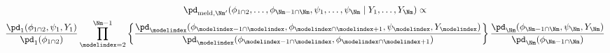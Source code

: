 \begin{multline}
  \pd_{\text{meld}, \Nm'}(\phi_{1 \cap 2}, \ldots, \phi_{\Nm - 1 \cap \Nm}, \psi_{1}, \ldots, \psi_{\Nm} \mid Y_{1}, \ldots, Y_{\Nm}) \propto \\ 
  \frac {
      \pd_{1} (\phi_{1 \cap 2}, \psi_{1}, Y_{1})
    } {
      \pd_{1}(\phi_{1 \cap 2})
    }
  \prod_{\modelindex = 2}^{\Nm - 1} \left\{
    \frac {
      \pd_{\modelindex} (\phi_{\modelindex - 1 \cap \modelindex}, \phi_{\modelindex \cap \modelindex + 1}, \psi_{\modelindex}, Y_{\modelindex})
    } {
      \pd_{\modelindex}(\phi_{\modelindex - 1 \cap \modelindex}, \phi_{\modelindex \cap \modelindex + 1})
    }
  \right\}
  \frac {
    \pd_{\Nm} (\phi_{\Nm - 1 \cap \Nm}, \psi_{\Nm}, Y_{\Nm})
  } {
    \pd_{\Nm}(\phi_{\Nm - 1 \cap \Nm})
  }
  \label{eqn:stage-M-target}
\end{multline}